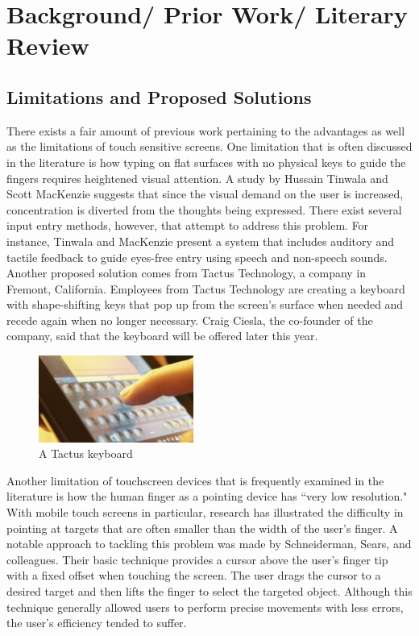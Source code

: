 \documentclass{article}
\begin{document}
\section{Background/ Prior Work/ Literary Review}
\subsection{Limitations and Proposed Solutions}
There exists a fair amount of previous work pertaining to the advantages as well as the limitations of touch sensitive screens. One limitation that is often discussed in the literature is how typing on flat surfaces with no physical keys to guide the fingers requires heightened visual attention. A study by Hussain Tinwala and Scott MacKenzie suggests that since the visual demand on the user is increased, concentration is diverted from the thoughts being expressed. \cite{Tinwala:2010:ETE:1868914.1868972} There exist several input entry methods, however, that attempt to address this problem. For instance, Tinwala and MacKenzie present a system that includes auditory and tactile feedback to guide eyes-free entry using speech and non-speech sounds. \cite{Tinwala:2010:ETE:1868914.1868972} Another proposed solution comes from Tactus Technology, a company in Fremont, California. Employees from Tactus Technology are creating a keyboard with shape-shifting keys that pop up from the screen's surface when needed and recede again when no longer necessary.\cite{Tactus} Craig Ciesla, the co-founder of the company, said that the keyboard will be offered later this year. 

\begin{figure}[ht]
\centering
\includegraphics[width=2in]{tactus-keyboard.jpg} 
\caption{A Tactus keyboard}
\label{figure-sample}
\end{figure}

Another limitation of touchscreen devices that is frequently examined in the literature is how the human finger as a pointing device has ``very low resolution."\cite{Albinsson} With mobile touch screens in particular, research has illustrated the difficulty in pointing at targets that are often smaller than the width of the user's finger. A notable approach to tackling this problem was made by Schneiderman, Sears, and colleagues.\cite{Sears} Their basic technique provides a cursor above the user's finger tip with a fixed offset when touching the screen. The user drags the cursor to a desired target and then lifts the finger to select the targeted object. Although this technique generally allowed users to perform precise movements with less errors, the user's efficiency tended to suffer.\cite{Sears}
\end{document}
